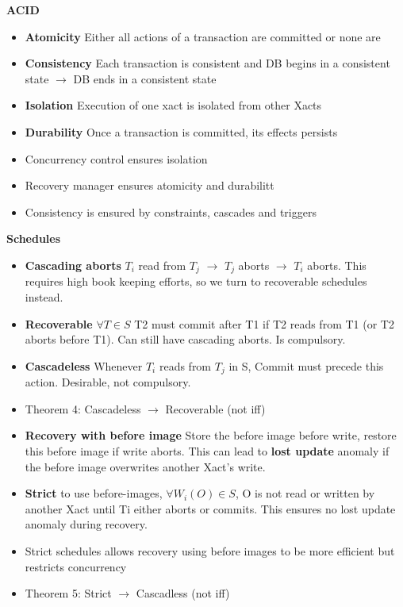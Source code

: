 \documentclass[10pt, landscape]{article}
\begin{document}
\begin{multicols}{4}
\textbf{ACID}
\begin{itemize}
  \item \textbf{Atomicity} Either all actions of a transaction are committed or none are
  \item \textbf{Consistency} Each transaction is consistent and DB begins in a consistent state $\rightarrow$ DB ends in a consistent state
  \item \textbf{Isolation} Execution of one xact is isolated from other Xacts 
  \item \textbf{Durability} Once a transaction is committed, its effects persists
  \item Concurrency control ensures isolation 
  \item Recovery manager ensures atomicity and durabilitt
  \item Consistency is ensured by constraints, cascades and triggers
\end{itemize}


\textbf{Schedules} \\
\begin{itemize} 
  \item \textbf{Cascading aborts} $T_i$ read from $T_j$ $\rightarrow$ $T_j$ aborts $\rightarrow$ $T_i$ aborts. This requires high book keeping efforts, so we turn to recoverable schedules instead.
  \item \textbf{Recoverable} $\forall T \in S$ T2 must commit after T1 if T2 reads from T1 (or T2 aborts before T1). Can still have cascading aborts. Is compulsory. 
  \item \textbf{Cascadeless} Whenever $T_i$ reads from $T_j$ in S, Commit must precede this action. Desirable, not compulsory.
  \item Theorem 4: Cascadeless $\rightarrow$ Recoverable (not iff)
  \item \textbf{Recovery with before image} Store the before image before write, restore this before image if write aborts. This can lead to \textbf{lost update} anomaly if the before image overwrites another Xact's write.
  \item \textbf{Strict}  to use before-images, $\forall W_i(O) \in S$, O is not read or written by another Xact until Ti either aborts or commits. This ensures no lost update anomaly during recovery.
  \item Strict schedules allows recovery using before images to be more efficient but restricts concurrency
  \item Theorem 5: Strict $\rightarrow$ Cascadless (not iff)
\end{itemize}


\end{multicols}
\end{document}
